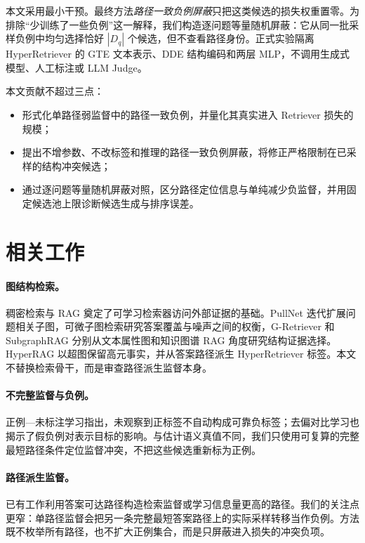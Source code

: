 \documentclass[sigconf,review,anonymous]{acmart}
\begin{document}
本文采用最小干预。最终方法\emph{路径一致负例屏蔽}只把这类候选的损失权重置零。为排除``少训练了一些负例''这一解释，我们构造逐问题等量随机屏蔽：它从同一批采样负例中均匀选择恰好 $|D_q|$ 个候选，但不查看路径身份。正式实验隔离 HyperRetriever 的 GTE 文本表示、DDE 结构编码和两层 MLP，不调用生成式模型、人工标注或 LLM Judge。

本文贡献不超过三点：

\begin{itemize}
  \item 形式化单路径弱监督中的路径一致负例，并量化其真实进入 Retriever 损失的规模；
  \item 提出不增参数、不改标签和推理的路径一致负例屏蔽，将修正严格限制在已采样的结构冲突候选；
  \item 通过逐问题等量随机屏蔽对照，区分路径定位信息与单纯减少负监督，并用固定候选池上限诊断候选生成与排序误差。
\end{itemize}

\section{相关工作}

\paragraph{图结构检索。}
稠密检索与 RAG 奠定了可学习检索器访问外部证据的基础\cite{karpukhin2020dpr,lewis2020rag}。PullNet 迭代扩展问题相关子图\cite{sun2019pullnet}，可微子图检索研究答案覆盖与噪声之间的权衡\cite{zhang2022subgraph}，G-Retriever 和 SubgraphRAG 分别从文本属性图和知识图谱 RAG 角度研究结构证据选择\cite{he2024gretriever,li2025subgraphrag}。HyperRAG 以超图保留高元事实，并从答案路径派生 HyperRetriever 标签\cite{lien2026hyperrag}。本文不替换检索骨干，而是审查路径派生监督本身。

\paragraph{不完整监督与负例。}
正例---未标注学习指出，未观察到正标签不自动构成可靠负标签\cite{elkan2008pu,kiryo2017nnpu}；去偏对比学习也揭示了假负例对表示目标的影响\cite{chuang2020debiased}。与估计语义真值不同，我们只使用可复算的完整最短路径条件定位监督冲突，不把这些候选重新标为正例。

\paragraph{路径派生监督。}
已有工作利用答案可达路径构造检索监督或学习信息量更高的路径\cite{zhang2022subgraph,cattaneo2025groundtruth,gao2026pathise}。我们的关注点更窄：单路径监督会把另一条完整最短答案路径上的实际采样转移当作负例。方法既不枚举所有路径，也不扩大正例集合，而是只屏蔽进入损失的冲突负项。
\end{document}

